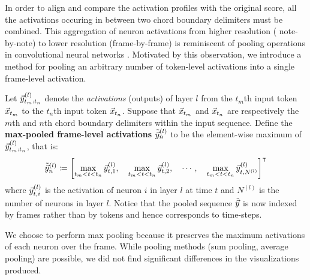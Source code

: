 In order to align and compare the activation profiles with the original score,
all the activations occuring in between two chord boundary delimiters must be
combined. This aggregation of neuron activations from higher resolution (\eg
note-by-note) to lower resolution (\eg frame-by-frame) is reminiscent of
pooling operations in convolutional neural networks
\citep{scherer2010evaluation}. Motivated by this observation, we introduce a
method for pooling an arbitrary number of token-level activations into a single
frame-level activation.

Let $\vec{y}^{(l)}_{{t_m}:{t_n}}$ denote the \emph{activations} (\eg outputs) of
layer $l$ from the $t_m$th input token $\vec{x}_{t_m}$ to the $t_n$th input token
$\vec{x}_{t_n}$. Suppose that $\vec{x}_{t_m}$ and $\vec{x}_{t_n}$ are respectively the $m$th
and $n$th chord boundary delimiters within the input sequence. Define the
\textbf{max-pooled frame-level activations} $\tilde{\vec{y}}^{(l)}_n$ to be the
element-wise maximum of $\vec{y}^{(l)}_{{t_m}:{t_n}}$, that is:
\begin{equation}
    \tilde{\vec{y}}^{(l)}_n \coloneqq \left[
        \max_{t_m < t < t_n} \vec{y}^{(l)}_{t,1},\quad
        \max_{t_m < t < t_n} \vec{y}^{(l)}_{t,2},\quad
        \cdots,\quad
        \max_{t_m < t < t_n} \vec{y}^{(l)}_{t,N^{(l)}}
    \right]^\intercal
\end{equation}
where $\vec{y}^{(l)}_{t,i}$ is the activation of neuron $i$ in layer $l$ at time $t$
and $N^{(l)}$ is the number of neurons in layer $l$. Notice that the pooled
sequence $\tilde{\vec{y}}$ is now indexed by frames rather than by tokens and hence
corresponds to time-steps.

We choose to perform max pooling because it preserves the maximum activations
of each neuron over the frame. While pooling methods (\eg sum pooling, average
pooling) are possible, we did not find significant differences in the
visualizations produced.


